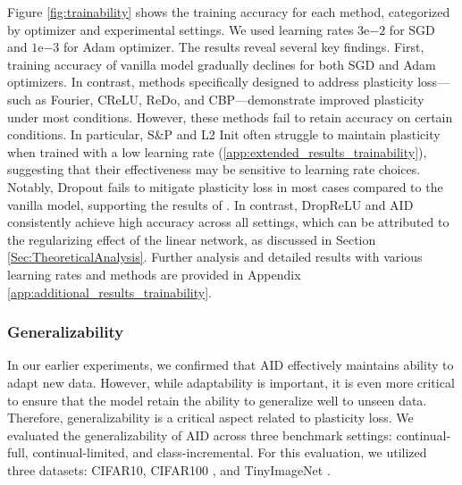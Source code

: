 Figure \ref{fig:trainability} shows the training accuracy for each method, categorized by optimizer and experimental settings.
We used learning rates $3\mathrm{e}{-2}$ for SGD and $1\mathrm{e}{-3}$ for Adam optimizer.
The results reveal several key findings.
First, training accuracy of vanilla model gradually declines for both SGD and Adam optimizers.
In contrast, methods specifically designed to address plasticity loss—such as Fourier, CReLU, ReDo, and CBP—demonstrate improved plasticity under most conditions.
However, these methods fail to retain accuracy on certain conditions.
In particular, S\&P and L2 Init often struggle to maintain plasticity when trained with a low learning rate (\ref{app:extended_results_trainability}), suggesting that their effectiveness may be sensitive to learning rate choices.
Notably, Dropout fails to mitigate plasticity loss in most cases compared to the vanilla model, supporting the results of \citet{dohare2024loss}.
In contrast, DropReLU and AID consistently achieve high accuracy across all settings, which can be attributed to the regularizing effect of the linear network, as discussed in Section \ref{Sec:TheoreticalAnalysis}.
Further analysis and detailed results with various learning rates and methods are provided in Appendix \ref{app:additional_results_trainability}.


\subsubsection{Generalizability}
In our earlier experiments, we confirmed that AID effectively maintains ability to adapt new data.
However, while adaptability is important, it is even more critical to ensure that the model retain the ability to generalize well to unseen data.
Therefore, generalizability is a critical aspect related to plasticity loss.
We evaluated the generalizability of AID across three benchmark settings: continual-full, continual-limited, and class-incremental.
For this evaluation, we utilized three datasets: CIFAR10, CIFAR100 \cite{krizhevsky2009learning}, and TinyImageNet \cite{le2015tiny}.

